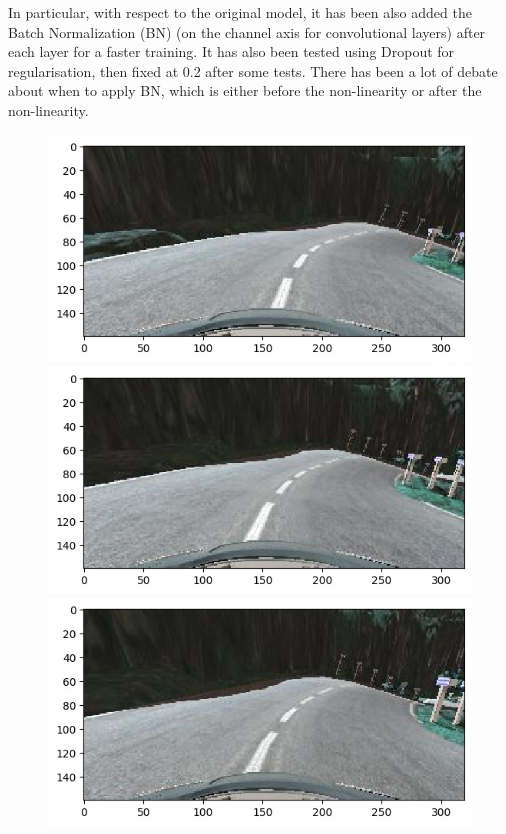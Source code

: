 \documentclass[10pt,twocolumn,letterpaper]{article}
\begin{document}
In particular, with respect to the original model, it has been also added the Batch Normalization (BN) (on the channel axis for convolutional layers) after each layer for a faster training. It has also been tested using Dropout for regularisation, then fixed at 0.2 after some tests. There has been a lot of debate about when to apply BN, which is either before the non-linearity or after the non-linearity.

\begin{figure}
    \centering
    \includegraphics[scale=0.22]{1st-track/no-center_2019_04_02_18_07_15_088.jpg}
    \includegraphics[scale=0.22]{1st-track/no-center_2019_04_02_18_07_15_774.jpg}
    \includegraphics[scale=0.22]{1st-track/no-center_2019_04_02_18_07_16_461.jpg} \\

\end{figure}
\end{document}
